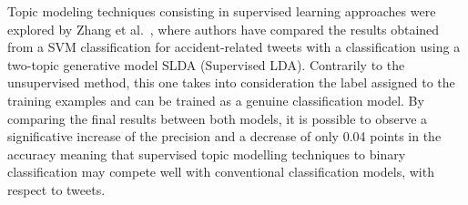 Topic modeling techniques consisting in supervised learning approaches were explored by Zhang et al.~\cite{zhang2016mining}, where authors have compared the results obtained from a SVM classification for accident-related tweets with a classification using a two-topic generative model SLDA (Supervised \gls{LDA}). Contrarily to the unsupervised method, this one takes into consideration the label assigned to the training examples and can be trained as a genuine classification model. By comparing the final results between both models, it is possible to observe a significative increase of the precision and a decrease of only 0.04 points in the accuracy meaning that supervised topic modelling techniques to binary classification may compete well with conventional classification models, with respect to tweets.

\begin{table}[htbp]
	\centering
	\caption{Brief overview of the related work for topic modelling}
	\label{tab:topic_related_work}
\end{table}
